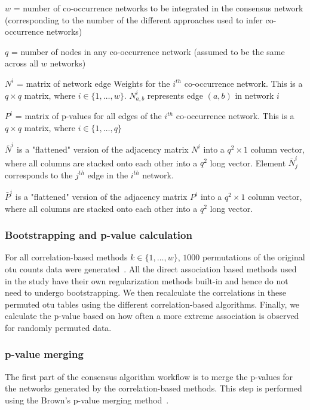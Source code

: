   $w$ = number of co-occurrence networks to be integrated in the consensus network (corresponding to the number of the different approaches used to infer co-occurrence networks)

  $q$ = number of nodes in any co-occurrence network (assumed to be the same across all $w$ networks)


  $N^i$ = matrix of network edge Weights for the $i^{th}$ co-occurrence network. This is a $q \times q$ matrix, where $i \in \{1,\dots,w\}$. $N^i_{a,b}$ represents edge $(a,b)$ in network $i$

  $P^i$ = matrix of p-values for all edges of the $i^{th}$ co-occurrence network. This is a $q \times q$ matrix, where $i \in \{1,\dots,q\}$


  $\bar{N}^i$ is a "flattened" version of the adjacency matrix $N^i$ into a $q^2 \times 1$ column vector, where all columns are stacked onto each other into a $q^2$ long vector. Element $\bar{N}^i_j$ corresponds to the $j^{th}$ edge in the $i^{th}$ network.

  $\bar{P}^i$ is a "flattened" version of the adjacency matrix $P^i$ into a $q^2 \times 1$ column vector, where all columns are stacked onto each other into a $q^2$ long vector.

  \subsubsection*{Bootstrapping and p-value calculation}
  For all correlation-based methods $k \in \{1,\dots,w\}$, $1000$ permutations of the original \ac{otu} counts data were generated~\cite{Watts2018}.
  All the direct association based methods used in the study have their own regularization methods built-in and hence do not need to undergo bootstrapping.
  We then recalculate the correlations in these permuted \ac{otu} tables using the different correlation-based algorithms.
  Finally, we calculate the p-value based on how often a more extreme association is observed for randomly permuted data.

  \subsubsection*{p-value merging}

  The first part of the consensus algorithm workflow is to merge the p-values for the networks generated by the correlation-based methods.
  This step is performed using the Brown's p-value merging method~\cite{Poole_Gibbs_Shmulevich_Bernard_Knijnenburg_2016,faustCoNetAppInference2016}.


